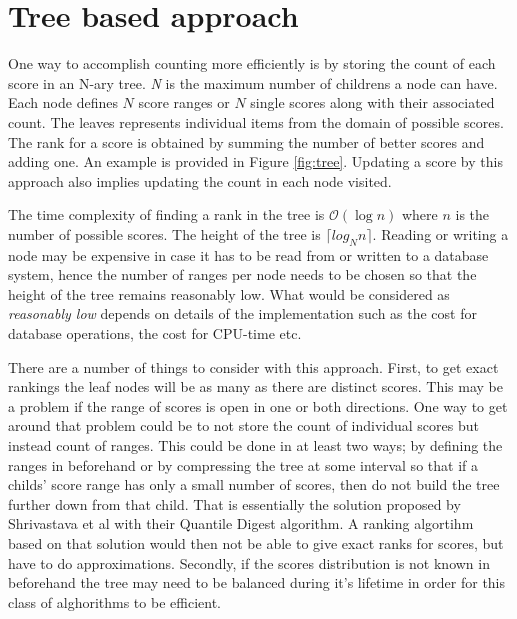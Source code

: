 \section{\label{sec:tree}Tree based approach}

One way to accomplish counting more efficiently is by storing the count of each score in an N-ary tree. \emph{N} is the maximum number of childrens a node can have. Each node defines $N$ score ranges or $N$ single scores along with their associated count. The leaves represents individual items from the domain of possible scores. The rank for a score is obtained by summing the number of better scores and adding one. An example is provided in Figure \ref{fig:tree}. Updating a score by this approach also implies updating the count in each node visited.

The time complexity of finding a rank in the tree is $\mathcal{O}(\log{} n)$ where $n$ is the number of possible scores. The height of the tree is $\lceil log_{N}n \rceil$. Reading or writing a node may be expensive in case it has to be read from or written to a database system, hence the number of ranges per node needs to be chosen so that the height of the tree remains reasonably low. What would be considered as \emph{reasonably low} depends on details of the implementation such as the cost for database operations, the cost for CPU-time etc. 

There are a number of things to consider with this approach. First, to get exact rankings the leaf nodes will be as many as there are distinct scores. This may be a problem if the range of scores is open in one or both directions. One way to get around that problem could be to not store the count of individual scores but instead count of ranges. This could be done in at least two ways; by defining the ranges in beforehand or by compressing the tree at some interval so that if a childs' score range has only a small number of scores, then do not build the tree further down from that child. That is essentially the solution proposed by Shrivastava et al\cite{quantile_digest} with their Quantile Digest algorithm. A ranking algortihm based on that solution would then not be able to give exact ranks for scores, but have to do approximations. Secondly, if the scores distribution is not known in beforehand the tree may need to be balanced during it's lifetime in order for this class of alghorithms to be efficient.

